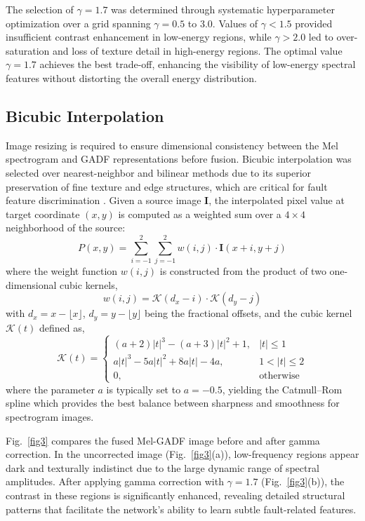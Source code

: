 \documentclass[twocolumn,iicol,pdflatex,sn-mathphys-num]{sn-jnl}%
\begin{document}
The selection of $\gamma = 1.7$ was determined through systematic hyperparameter optimization over a grid spanning $\gamma = 0.5$ to $3.0$. Values of $\gamma < 1.5$ provided insufficient contrast enhancement in low-energy regions, while $\gamma > 2.0$ led to over-saturation and loss of texture detail in high-energy regions. The optimal value $\gamma = 1.7$ achieves the best trade-off, enhancing the visibility of low-energy spectral features without distorting the overall energy distribution.

\subsection{Bicubic Interpolation}
Image resizing is required to ensure dimensional consistency between the Mel spectrogram and GADF representations before fusion. Bicubic interpolation was selected over nearest-neighbor and bilinear methods due to its superior preservation of fine texture and edge structures, which are critical for fault feature discrimination \cite{9257189}. Given a source image $\bm{I}$, the interpolated pixel value at target coordinate $(x, y)$ is computed as a weighted sum over a $4 \times 4$ neighborhood of the source:
\begin{equation}
	P(x, y) = \sum_{i=-1}^{2} \sum_{j=-1}^{2} w(i, j) \cdot \bm{I}(x + i, y + j)
\end{equation}
\noindent where the weight function $w(i, j)$ is constructed from the product of two one-dimensional cubic kernels,
\begin{equation}
	w(i, j) = \mathcal{K}(d_x - i) \cdot \mathcal{K}(d_y - j)
\end{equation}
with $d_x = x - \lfloor x \rfloor$, $d_y = y - \lfloor y \rfloor$ being the fractional offsets, and the cubic kernel $\mathcal{K}(t)$ defined as,
\begin{equation}
	\mathcal{K}(t) = \begin{cases}
		(a + 2)|t|^3 - (a + 3)|t|^2 + 1, & |t| \leq 1 \\
		a|t|^3 - 5a|t|^2 + 8a|t| - 4a, & 1 < |t| \leq 2 \\
		0, & \text{otherwise}
	\end{cases}
\end{equation}
\noindent where the parameter $a$ is typically set to $a = -0.5$, yielding the Catmull--Rom spline which provides the best balance between sharpness and smoothness for spectrogram images.

Fig.~\ref{fig3} compares the fused Mel-GADF image before and after gamma correction. In the uncorrected image (Fig.~\ref{fig3}(a)), low-frequency regions appear dark and texturally indistinct due to the large dynamic range of spectral amplitudes. After applying gamma correction with $\gamma = 1.7$ (Fig.~\ref{fig3}(b)), the contrast in these regions is significantly enhanced, revealing detailed structural patterns that facilitate the network's ability to learn subtle fault-related features.
\end{document}
